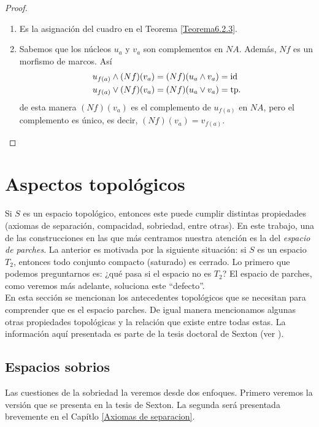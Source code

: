 \begin{proof}
    \begin{enumerate}
        \item Es la asignación del cuadro en el Teorema \ref{Teorema6.2.3}.
        \item Sabemos que los núcleos $u_a$ y $v_a$ son complementos en $NA$. Además, $Nf$ es un morfismo de marcos. Así 
        \[
        \begin{split}
        u_{f(a)}\wedge (Nf)(v_a)&=(Nf)(u_a\wedge v_a)=\mathrm{id}\\  u_{f(a)}\vee (Nf)(v_a)&=(Nf)(u_a\vee v_a)=\mathrm{tp}.
        \end{split}
        \]
        de esta manera $(Nf)(v_a)$ es el complemento de $u_{f(a)}$ en $NA$, pero el complemento es único, es decir, $(Nf)(v_a)=v_{f(a)}$.
    \end{enumerate}
\end{proof}


\section{Aspectos topológicos}\label{Topología}

Si $S$ es un espacio topológico, entonces este puede cumplir distintas propiedades (axiomas de separación, compacidad, sobriedad, entre otras). En este trabajo, una de las construcciones en las que más centramos nuestra atención es la del \emph{espacio de parches}. La anterior es motivada por la siguiente situación: si $S$ es un espacio $T_2$, entonces todo conjunto compacto (saturado) es cerrado. 
Lo primero que podemos preguntarnos es: ¿qué pasa si el espacio no es $T_2$? El espacio de parches, como veremos más adelante, soluciona este ``defecto''.\\
    
En esta sección se mencionan los antecedentes topológicos que se necesitan para comprender que es el espacio parches. 
De igual manera mencionamos algunas otras propiedades topológicas y la relación que existe entre todas estas. La información aquí presentada es parte de la tesis 
doctoral de Sexton (ver \cite{R.S.}).

\subsection{Espacios sobrios}\label{Espacios sobrios}

Las cuestiones de la sobriedad la veremos desde dos enfoques. Primero veremos la versión que se presenta en la 
tesis de Sexton. La segunda será presentada brevemente en el Capítlo \ref{Axiomas de separacion}.

